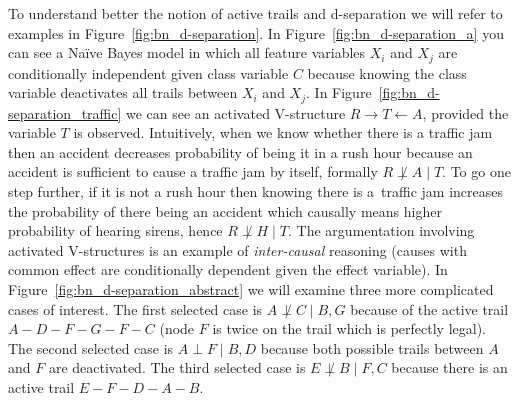 \documentclass[english,cover]{fitthesis} %
\newcommand{\term}[1]{\emph{#1}}           %
\begin{document}
To understand better the notion of active trails and d-separation we will refer to examples in Figure~\ref{fig:bn_d-separation}. In Figure~\ref{fig:bn_d-separation_a} you can see a Naïve Bayes model in which all feature variables $X_i$ and $X_j$ are conditionally independent given class variable $C$ because knowing the class variable deactivates all trails between $X_i$ and $X_j$.
In Figure~\ref{fig:bn_d-separation_traffic} we can see an activated V-structure $R\rightarrow T \leftarrow A$, provided the variable $T$ is observed. Intuitively, when we know whether there is a traffic jam then an accident decreases probability of being it in a rush hour because an accident is sufficient to cause a traffic jam by itself, formally $R \not\perp A \mid T$. To go one step further, if it is not a rush hour then knowing there is a~traffic jam increases the probability of there being an accident which causally means higher probability of hearing sirens, hence $R\not\perp H \mid T$. The argumentation involving activated V-structures is an example of \term{inter-causal} reasoning (causes with common effect are conditionally dependent given the effect variable).
In Figure~\ref{fig:bn_d-separation_abstract} we will examine three more complicated cases of interest. The first selected case is $A \not\perp C \mid B, G$ because of the active trail $A-D-F-G-F-C$ (node $F$ is twice on the trail which is perfectly legal). The second selected case is $A \perp F \mid B, D$ because both possible trails between $A$ and $F$ are deactivated. The third selected case is $E \not\perp B \mid F, C$ because there is an active trail $E-F-D-A-B$.
\end{document}
